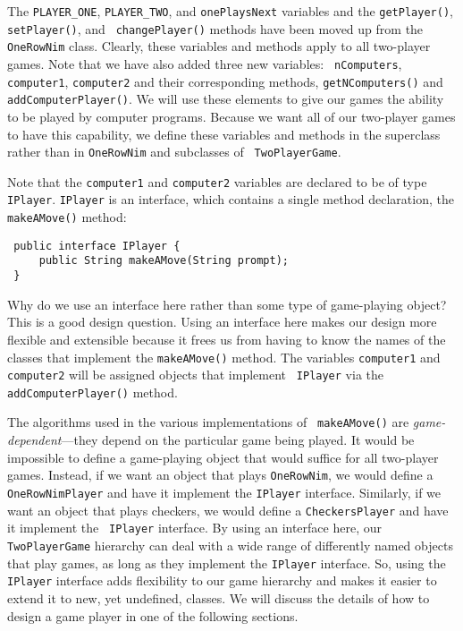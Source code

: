 The {\tt PLAYER\_ONE}, {\tt PLAYER\_TWO}, and {\tt onePlaysNext}
variables and the {\tt getPlayer()}, {\tt setPlayer()}, and {\tt
changePlayer()} methods have been moved up from the {\tt OneRowNim}
class. Clearly, these variables and methods apply to all two-player
games.  Note that we have also added three new variables:  {\tt
nComputers}, {\tt computer1}, {\tt computer2} and their corresponding
methods, {\tt getNComputers()} and {\tt addComputerPlayer()}.  We will
use these elements to give our games the ability to be played by
computer programs. Because we want all of our two-player games to have
this capability, we define these variables and methods in the
superclass rather than in {\tt OneRowNim} and subclasses of {\tt
TwoPlayerGame}.

Note that the {\tt computer1} and {\tt computer2} variables are declared
to be of type {\tt IPlayer}.  {\tt IPlayer} is an interface, which 
contains a single method declaration, the {\tt makeAMove()} method:

\begin{jjjlisting}
\begin{lstlisting}
 public interface IPlayer {
     public String makeAMove(String prompt);
 }
\end{lstlisting}
\end{jjjlisting}

\noindent Why do we use an interface here rather than some type of
game-playing object?  This is a good design question.  Using an
interface here makes our design more flexible and extensible because
it frees us from having to know the names of the classes that
implement the {\tt makeAMove()} method.  The variables {\tt computer1}
and {\tt computer2} will be assigned objects that implement {\tt
IPlayer} via the {\tt addComputerPlayer()} method.

The algorithms used in the various implementations of {\tt
{}
makeAMove()} are {\em game-dependent}---they depend on the particular
game being played.  It would be impossible to define a game-playing
object that would suffice for all two-player games. Instead, if we
want an object that plays {\tt OneRowNim}, we would define a {\tt
OneRowNimPlayer} and have it implement the {\tt IPlayer}
interface. Similarly, if we want an object that plays checkers, we
would define a {\tt CheckersPlayer} and have it implement the {\tt
IPlayer} interface.  By using an interface here, our {\tt
TwoPlayerGame} hierarchy can deal with a wide range of
differently named objects that play games, as long as they implement
the {\tt IPlayer} interface.  So, using the {\tt IPlayer} interface
adds flexibility to our game hierarchy and makes it easier to extend
it to new, yet undefined, classes.  We will discuss the details of how
to design a game player in one of the following sections.

